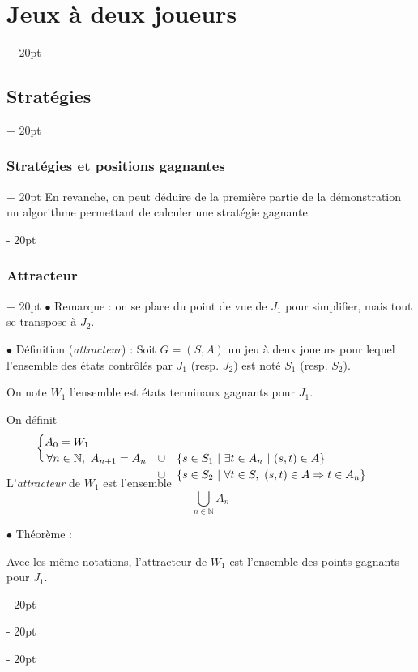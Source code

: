 \documentclass[a4paper, 12pt, twoside]{article}
\newcommand{\N}{\mathbb{N}} %
\newcommand{\set}[1]{\left\{ #1 \right\}}
\newcommand{\ind}[1][20pt]{\advance\leftskip + #1}
\newcommand{\deind}[1][20pt]{\advance\leftskip - #1}
\newenvironment{indt}[2][20pt]{#2 \par \ind[#1]}{\par \deind} %
\begin{document}
\begin{indt}{\section{Jeux à deux joueurs}}
\begin{indt}{\subsection{Stratégies}}
\begin{indt}{\subsubsection{Stratégies et positions gagnantes}}
                En revanche, on peut déduire de la première partie de la démonstration un algorithme permettant de calculer une stratégie gagnante.
            \end{indt}

            \vspace{12pt}
            
            \begin{indt}{\subsubsection{Attracteur}}
                $\bullet$ Remarque : on se place du point de vue de $J_1$ pour simplifier, mais tout se transpose à $J_2$.

                $\bullet$ Définition (\emph{attracteur}) : Soit $G = (S, A)$ un jeu à deux joueurs pour lequel l'ensemble des états contrôlés par $J_1$ (resp. $J_2$) est noté $S_1$ (resp. $S_2$).

                On note $W_1$ l'ensemble est états terminaux gagnants pour $J_1$.

                On définit
                \[
                    \begin{cases}
                        A_0 = W_1
                        \\
                        \!\!
                        \begin{array}{rcl}
                            \forall n \in \N,\
                            A_{n + 1} = A_n
                            &\cup&
                            \set{s \in S_1\ |\ \exists t \in A_n\ |\ (s, t) \in A}
                            \\
                            &\cup& \set{s \in S_2\ |\ \forall t \in S,\ (s, t) \in A \Rightarrow t \in A_n}
                        \end{array}
                        \vspace{-18pt}
                    \end{cases}
                \]

                \vspace{12pt}

                L'\emph{attracteur} de $W_1$ est l'ensemble
                \[
                    \bigcup_{n \in \N} A_n
                \]

                \vspace{12pt}
                
                $\bullet$ Théorème :
                \begin{emphBox}
                    Avec les même notations, l'attracteur de $W_1$ est l'ensemble des points gagnants pour $J_1$.
                \end{emphBox}


\end{indt}
\end{indt}
\end{indt}
\end{document}
